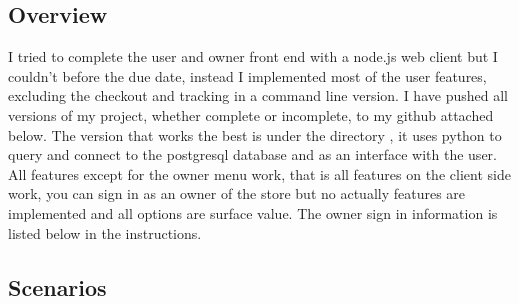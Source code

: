 \documentclass[a4 paper]{article}
\begin{document}
\subsection{Overview}
\qquad I tried to complete the user and owner front end with a node.js web client but I couldn't before the due date, instead I implemented most of the user features, excluding the checkout and tracking in a command line version. I have pushed all versions of my project, whether complete or incomplete, to my github attached below. The version that works the best is under the directory , it uses python to query and connect to the postgresql database and as an interface with the user. All features except for the owner menu work, that is all features on the client side work, you can sign in as an owner of the store but no actually features are implemented and all options are surface value. The owner sign in information is listed below in the instructions.
\subsection{Scenarios}
\end{document}
